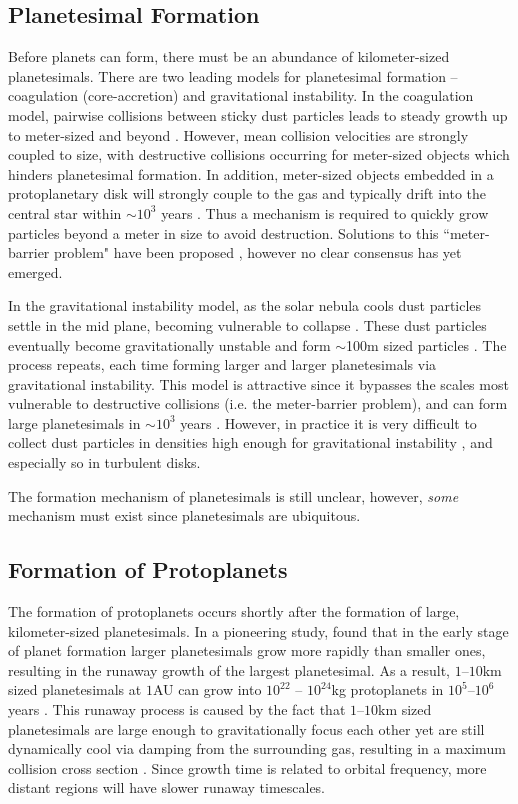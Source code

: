 \subsection{Planetesimal Formation}
Before planets can form, there must be an abundance of kilometer-sized planetesimals.
There are two leading models for planetesimal formation -- coagulation (core-accretion) and gravitational instability. 
In the coagulation model, pairwise collisions between sticky dust particles leads to steady growth up to meter-sized and beyond \citep{Weidenschilling1977b, Armitage2010}.
However, mean collision velocities are strongly coupled to size, with destructive collisions occurring for meter-sized objects \citep{Weidenschilling1977b, Blum2008} which hinders planetesimal formation. 
In addition, meter-sized objects embedded in a protoplanetary disk will strongly couple to the gas and typically drift into the central star within $\sim 10^3$ years \citep{Weidenschilling1977b}.
Thus a mechanism is required to quickly grow particles beyond a meter in size to avoid destruction. 
Solutions to this ``meter-barrier problem" have been proposed \citep[e.g.][]{Boley2014}, however no clear consensus has yet emerged.  

In the gravitational instability model, as the solar nebula cools dust particles settle in the mid plane, becoming vulnerable to collapse \citep{Goldreich1973}.
These dust particles eventually become gravitationally unstable and form $\sim$100m sized particles \citep{Goldreich1973}. 
The process repeats, each time forming larger and larger planetesimals via gravitational instability.
This model is attractive since it bypasses the scales most vulnerable to destructive collisions (i.e. the meter-barrier problem), and can form large planetesimals in $\sim 10^3$ years \citep{Goldreich1973, Armitage2007}.
However, in practice it is very difficult to collect dust particles in densities high enough for gravitational instability \citep{Armitage2007}, and especially so in turbulent disks.
 
The formation mechanism of planetesimals is still unclear, however, \textit{some} mechanism must exist since planetesimals are ubiquitous. 

\subsection{Formation of Protoplanets}
The formation of protoplanets occurs shortly after the formation of large, kilometer-sized planetesimals.
In a pioneering study, \citet{Greenberg1978} found that in the early stage of planet formation larger planetesimals grow more rapidly than smaller ones, resulting in the runaway growth of the largest planetesimal. 
As a result, $1$--$10$km sized planetesimals at $1$AU can grow into $10^{22}$ -- $10^{24}$kg protoplanets in $10^5$--$10^6$ years \citep{Wetherill1989}.
This runaway process is caused by the fact that $1$--$10$km sized planetesimals are large enough to gravitationally focus each other yet are still dynamically cool via damping from the surrounding gas, resulting in a maximum collision cross section \citep{Armitage2010}.
Since growth time is related to orbital frequency, more distant regions will have slower runaway timescales.

